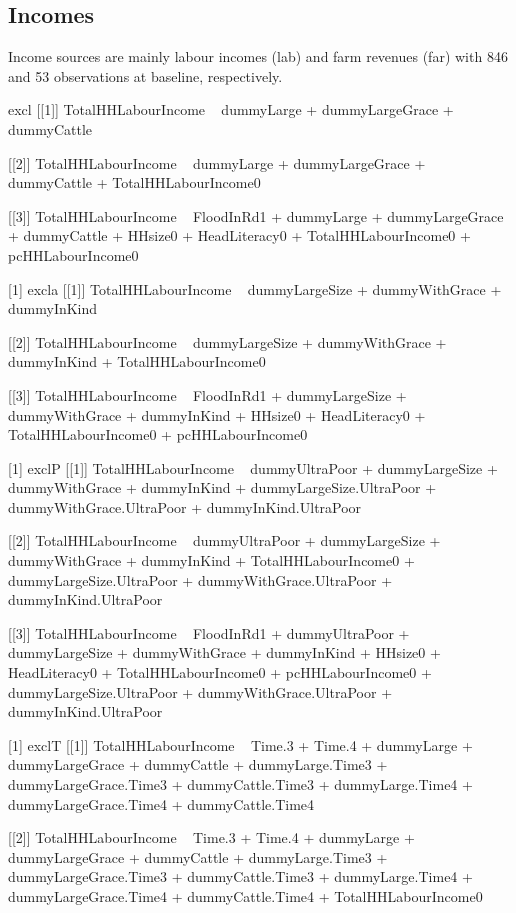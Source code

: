 \subsection{Incomes}


Income sources are mainly labour incomes (\textsf{lab}) and farm revenues (\textsf{far}) with 846 and 53 observations at baseline, respectively. 




\begin{Schunk}
\begin{Soutput}
[1] excl
[[1]]
TotalHHLabourIncome ~ dummyLarge + dummyLargeGrace + dummyCattle

[[2]]
TotalHHLabourIncome ~ dummyLarge + dummyLargeGrace + dummyCattle + 
    TotalHHLabourIncome0

[[3]]
TotalHHLabourIncome ~ FloodInRd1 + dummyLarge + dummyLargeGrace + 
    dummyCattle + HHsize0 + HeadLiteracy0 + TotalHHLabourIncome0 + 
    pcHHLabourIncome0

[1] excla
[[1]]
TotalHHLabourIncome ~ dummyLargeSize + dummyWithGrace + dummyInKind

[[2]]
TotalHHLabourIncome ~ dummyLargeSize + dummyWithGrace + dummyInKind + 
    TotalHHLabourIncome0

[[3]]
TotalHHLabourIncome ~ FloodInRd1 + dummyLargeSize + dummyWithGrace + 
    dummyInKind + HHsize0 + HeadLiteracy0 + TotalHHLabourIncome0 + 
    pcHHLabourIncome0

[1] exclP
[[1]]
TotalHHLabourIncome ~ dummyUltraPoor + dummyLargeSize + dummyWithGrace + 
    dummyInKind + dummyLargeSize.UltraPoor + dummyWithGrace.UltraPoor + 
    dummyInKind.UltraPoor

[[2]]
TotalHHLabourIncome ~ dummyUltraPoor + dummyLargeSize + dummyWithGrace + 
    dummyInKind + TotalHHLabourIncome0 + dummyLargeSize.UltraPoor + 
    dummyWithGrace.UltraPoor + dummyInKind.UltraPoor

[[3]]
TotalHHLabourIncome ~ FloodInRd1 + dummyUltraPoor + dummyLargeSize + 
    dummyWithGrace + dummyInKind + HHsize0 + HeadLiteracy0 + 
    TotalHHLabourIncome0 + pcHHLabourIncome0 + dummyLargeSize.UltraPoor + 
    dummyWithGrace.UltraPoor + dummyInKind.UltraPoor

[1] exclT
[[1]]
TotalHHLabourIncome ~ Time.3 + Time.4 + dummyLarge + dummyLargeGrace + 
    dummyCattle + dummyLarge.Time3 + dummyLargeGrace.Time3 + 
    dummyCattle.Time3 + dummyLarge.Time4 + dummyLargeGrace.Time4 + 
    dummyCattle.Time4

[[2]]
TotalHHLabourIncome ~ Time.3 + Time.4 + dummyLarge + dummyLargeGrace + 
    dummyCattle + dummyLarge.Time3 + dummyLargeGrace.Time3 + 
    dummyCattle.Time3 + dummyLarge.Time4 + dummyLargeGrace.Time4 + 
    dummyCattle.Time4 + TotalHHLabourIncome0


\end{Soutput}
\end{Schunk}
